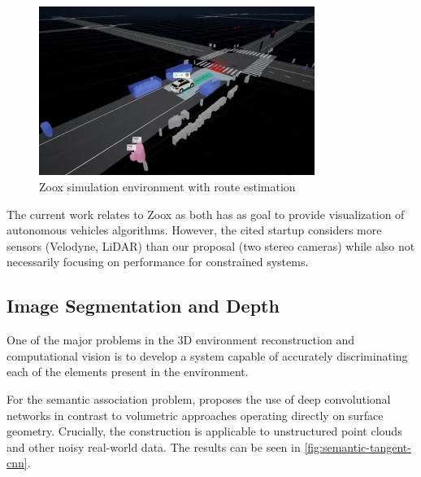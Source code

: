     \begin{figure}[H]
     \caption{\label{fig:zoox-simulation-monitoring}
Zoox simulation environment with route estimation}
     \begin{center}
        \includegraphics[width=0.8\textwidth]{images/zoox-simulation-monitoring.png}
     \end{center}
    \end{figure}
    
    The current work relates to Zoox as both has as goal to provide visualization of autonomous vehicles algorithms. However, the cited startup considers more sensors (Velodyne, LiDAR) than our proposal (two stereo cameras) while also not necessarily focusing on performance for constrained systems.

\subsection{Image Segmentation and Depth}

    One of the major problems in the 3D environment reconstruction and computational vision is to develop a system capable of accurately discriminating each of the elements present in the environment.
    
    For the semantic association problem, \cite{semantic_article} proposes the use of deep convolutional networks in contrast to volumetric approaches operating directly on surface geometry. Crucially, the construction is applicable to unstructured point clouds and other noisy real-world data. The results can be seen in \autoref{fig:semantic-tangent-cnn}.

